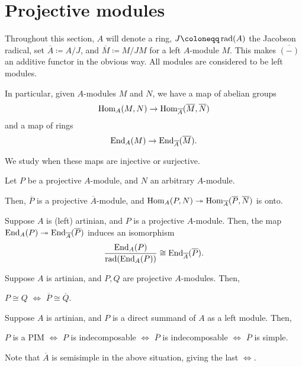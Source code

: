 \documentclass[12pt]{article}
\begin{document}
\section{Projective modules}

Throughout this section, 
$A$ will denote a ring, 
$J \coloneqq \rad(A)$ the Jacobson radical, 
set $\overline{A} \coloneqq A/J$, 
and $\overline{M} \coloneqq M/JM$ for a left $A$-module $M$. 
This makes $\overline{(-)}$ an additive functor in the obvious way. 
All modules are considered to be left modules. 

In particular, given $A$-modules $M$ and $N$, we have a map of abelian groups
\begin{equation*} 
	\operatorname{Hom}_{A}(M, N) \to \operatorname{Hom}_{\overline{A}}(\overline{M}, \overline{N})
\end{equation*}
and a map of rings
\begin{equation*} 
	\operatorname{End}_{A}(M) \to \operatorname{End}_{\overline{A}}(\overline{M}).
\end{equation*}

We study when these maps are injective or surjective.

\begin{thm}
	Let $P$ be a projective $A$-module, and $N$ an arbitrary $A$-module.

	Then, $\overline{P}$ is a projective $\overline{A}$-module, 
	and $\operatorname{Hom}_{A}(P, N) \twoheadrightarrow \operatorname{Hom}_{\overline{A}}(\overline{P}, \overline{N})$ is onto.
\end{thm}

\begin{thm}
	Suppose $A$ is (left) artinian, and $P$ is a projective $A$-module. Then, the map $\operatorname{End}_{A}(P) \twoheadrightarrow \operatorname{End}_{\overline{A}}(\overline{P})$ induces an isomorphism
	\begin{equation*} 
		\frac{\operatorname{End}_{A}(P)}{\operatorname{rad}(\operatorname{End}_{A}(P))} \cong \operatorname{End}_{\overline{A}}(\overline{P}).
	\end{equation*}
\end{thm}
\begin{cor} \label{cor:artinian-projective-isomorphic-mod-radical}
	Suppose $A$ is artinian, and $P, Q$ are projective $A$-modules. Then,
	\begin{center}
		$P \cong Q$ $\Leftrightarrow$ $\overline{P} \cong \overline{Q}$.
	\end{center}
\end{cor}

\begin{thm} \label{thm:artinian-PIM-criteria}
	Suppose $A$ is artinian, and $P$ is a direct summand of $A$ as a left module. Then,
	\begin{center}
		$P$ is a PIM $\Leftrightarrow$ $P$ is indecomposable $\Leftrightarrow$ $\overline{P}$ is indecomposable $\Leftrightarrow$ $\overline{P}$ is simple.
	\end{center}
\end{thm}
Note that $\overline{A}$ is semisimple in the above situation, giving the last $\Leftrightarrow$. 
\end{document}

